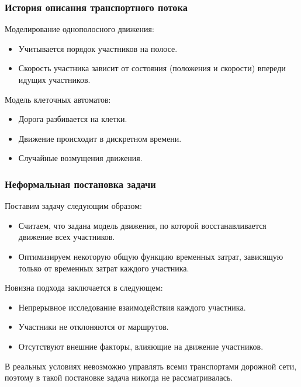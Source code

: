 \documentclass{beamer}
\begin{document}
\begin{frame}\frametitle{История описания транспортного потока}
	Моделирование однополосного движения:
	\begin{itemize}
		\item Учитывается порядок участников на полосе.
		
		\item Скорость участника зависит от состояния (положения и скорости) впереди идущих участников.
	\end{itemize}

	\bigskip
	
	Модель клеточных автоматов:
	\begin{itemize}
		\item Дорога разбивается на клетки.
		
		\item Движение происходит в дискретном времени.
		
		\item Случайные возмущения движения.
	\end{itemize}
\end{frame}

\begin{frame}\frametitle{Неформальная постановка задачи}
	
	Поставим задачу следующим образом:
	
	\begin{itemize}
		\item Считаем, что задана модель движения, по которой восстанавливается движение всех участников.
		
		\item Оптимизируем некоторую общую функцию временных затрат, зависящую только от временных затрат каждого участника.
	\end{itemize}
	
	\bigskip
	
	Новизна подхода заключается в следующем:
	\begin{itemize}
		\item Непрерывное исследование взаимодействия каждого участника.
		
		\item Участники не отклоняются от маршрутов.
		
		\item Отсутствуют внешние факторы, влияющие на движение участников.
	\end{itemize}

	\bigskip

	В реальных условиях невозможно управлять всеми транспортами дорожной сети, поэтому в такой постановке задача никогда не рассматривалась.

\end{frame}
\end{document}
